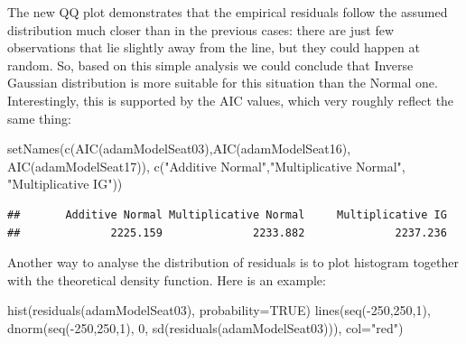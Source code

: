 \documentclass[
]{book}
\newenvironment{Shaded}{\begin{snugshade}}{\end{snugshade}}
\newcommand{\AttributeTok}[1]{\textcolor[rgb]{0.77,0.63,0.00}{#1}}
\newcommand{\ConstantTok}[1]{\textcolor[rgb]{0.00,0.00,0.00}{#1}}
\newcommand{\DecValTok}[1]{\textcolor[rgb]{0.00,0.00,0.81}{#1}}
\newcommand{\FunctionTok}[1]{\textcolor[rgb]{0.00,0.00,0.00}{#1}}
\newcommand{\NormalTok}[1]{#1}
\newcommand{\SpecialCharTok}[1]{\textcolor[rgb]{0.00,0.00,0.00}{#1}}
\newcommand{\StringTok}[1]{\textcolor[rgb]{0.31,0.60,0.02}{#1}}
\theoremstyle{definition}
\theoremstyle{definition}
\theoremstyle{definition}
\theoremstyle{definition}
\theoremstyle{remark}
\begin{document}
The new QQ plot demonstrates that the empirical residuals follow the assumed distribution much closer than in the previous cases: there are just few observations that lie slightly away from the line, but they could happen at random. So, based on this simple analysis we could conclude that Inverse Gaussian distribution is more suitable for this situation than the Normal one. Interestingly, this is supported by the AIC values, which very roughly reflect the same thing:

\begin{Shaded}
\begin{Highlighting}[]
\FunctionTok{setNames}\NormalTok{(}\FunctionTok{c}\NormalTok{(}\FunctionTok{AIC}\NormalTok{(adamModelSeat03),}\FunctionTok{AIC}\NormalTok{(adamModelSeat16),}
           \FunctionTok{AIC}\NormalTok{(adamModelSeat17)),}
         \FunctionTok{c}\NormalTok{(}\StringTok{"Additive Normal"}\NormalTok{,}\StringTok{"Multiplicative Normal"}\NormalTok{,}
           \StringTok{"Multiplicative IG"}\NormalTok{))}
\end{Highlighting}
\end{Shaded}

\begin{verbatim}
##       Additive Normal Multiplicative Normal     Multiplicative IG 
##              2225.159              2233.882              2237.236
\end{verbatim}

Another way to analyse the distribution of residuals is to plot histogram together with the theoretical density function. Here is an example:

\begin{Shaded}
\begin{Highlighting}[]
\FunctionTok{hist}\NormalTok{(}\FunctionTok{residuals}\NormalTok{(adamModelSeat03), }\AttributeTok{probability=}\ConstantTok{TRUE}\NormalTok{)}
\FunctionTok{lines}\NormalTok{(}\FunctionTok{seq}\NormalTok{(}\SpecialCharTok{{-}}\DecValTok{250}\NormalTok{,}\DecValTok{250}\NormalTok{,}\DecValTok{1}\NormalTok{),}
      \FunctionTok{dnorm}\NormalTok{(}\FunctionTok{seq}\NormalTok{(}\SpecialCharTok{{-}}\DecValTok{250}\NormalTok{,}\DecValTok{250}\NormalTok{,}\DecValTok{1}\NormalTok{), }\DecValTok{0}\NormalTok{, }\FunctionTok{sd}\NormalTok{(}\FunctionTok{residuals}\NormalTok{(adamModelSeat03))),}
      \AttributeTok{col=}\StringTok{"red"}\NormalTok{)}
\end{Highlighting}
\end{Shaded}
\end{document}
